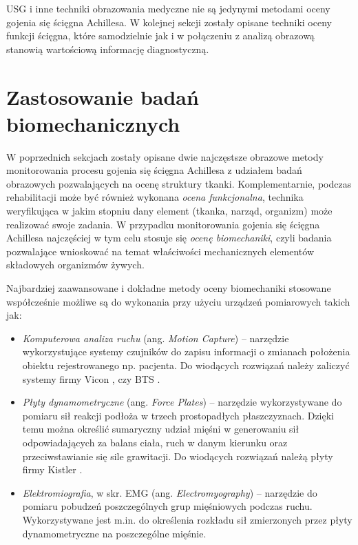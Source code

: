 USG i inne techniki obrazowania medyczne nie są jedynymi metodami oceny gojenia się ścięgna Achillesa. W kolejnej sekcji zostały opisane techniki oceny funkcji ścięgna, które samodzielnie jak i w połączeniu z analizą obrazową stanowią wartościową informację diagnostyczną.

\section{Zastosowanie badań biomechanicznych}

W poprzednich sekcjach zostały opisane dwie najczęstsze obrazowe metody monitorowania procesu gojenia się ścięgna Achillesa z udziałem badań obrazowych pozwalających na ocenę struktury tkanki. Komplementarnie, podczas rehabilitacji może być również wykonana \textit{ocena funkcjonalna}, technika weryfikująca w jakim stopniu dany element (tkanka, narząd, organizm) może realizować swoje zadania. W przypadku monitorowania gojenia się ścięgna Achillesa najczęściej w tym celu stosuje się \textit{ocenę biomechaniki}, czyli badania pozwalające wnioskować na temat właściwości mechanicznych elementów składowych organizmów żywych. 

Najbardziej zaawansowane i dokładne metody oceny biomechaniki stosowane współcześnie możliwe są do wykonania przy użyciu urządzeń pomiarowych takich jak:
\begin{itemize}
	\item \textit{Komputerowa analiza ruchu} (ang. \textit{Motion Capture}) -- narzędzie wykorzystujące systemy czujników do zapisu informacji o zmianach położenia obiektu rejestrowanego np. pacjenta. Do wiodących rozwiązań należy zaliczyć systemy firmy Vicon \cite{Vicon}, czy BTS \cite{BTS}.
	\item \textit{Płyty dynamometryczne} (ang. \textit{Force Plates}) -- narzędzie wykorzystywane do pomiaru sił reakcji podłoża w trzech prostopadłych płaszczyznach. Dzięki temu można określić sumaryczny udział mięśni w generowaniu sił odpowiadających za balans ciała, ruch w danym kierunku oraz przeciwstawianie się sile grawitacji. Do wiodących rozwiązań należą płyty firmy Kistler \cite{KISTLER}.
	\item \textit{Elektromiografia}, w skr. EMG (ang. \textit{Electromyography}) -- narzędzie do pomiaru pobudzeń poszczególnych grup mięśniowych podczas ruchu. Wykorzystywane jest m.in. do określenia rozkładu sił zmierzonych przez płyty dynamometryczne na poszczególne mięśnie.
\end{itemize}

